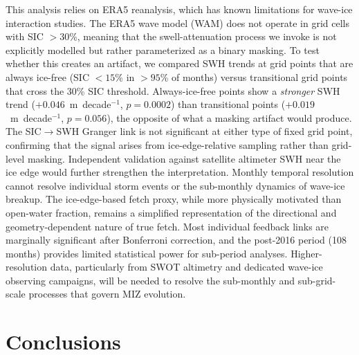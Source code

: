 \documentclass[11pt]{article}
\begin{document}
This analysis relies on ERA5 reanalysis, which has known limitations for wave-ice interaction studies. The ERA5 wave model (WAM) does not operate in grid cells with SIC $> 30$\%, meaning that the swell-attenuation process we invoke is not explicitly modelled but rather parameterized as a binary masking. To test whether this creates an artifact, we compared SWH trends at grid points that are always ice-free (SIC $< 15$\% in $> 95$\% of months) versus transitional grid points that cross the 30\% SIC threshold. Always-ice-free points show a \textit{stronger} SWH trend ($+0.046$~m~decade$^{-1}$, $p = 0.0002$) than transitional points ($+0.019$~m~decade$^{-1}$, $p = 0.056$), the opposite of what a masking artifact would produce. The SIC$\to$SWH Granger link is not significant at either type of fixed grid point, confirming that the signal arises from ice-edge-relative sampling rather than grid-level masking. Independent validation against satellite altimeter SWH near the ice edge would further strengthen the interpretation. Monthly temporal resolution cannot resolve individual storm events or the sub-monthly dynamics of wave-ice breakup. The ice-edge-based fetch proxy, while more physically motivated than open-water fraction, remains a simplified representation of the directional and geometry-dependent nature of true fetch. Most individual feedback links are marginally significant after Bonferroni correction, and the post-2016 period (108 months) provides limited statistical power for sub-period analyses. Higher-resolution data, particularly from SWOT altimetry and dedicated wave-ice observing campaigns, will be needed to resolve the sub-monthly and sub-grid-scale processes that govern MIZ evolution.

\section{Conclusions}
\label{sec:conclusions}
\end{document}
